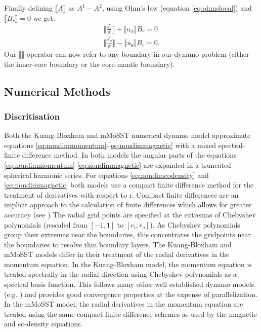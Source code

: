 Finally defining $\llbracket A \rrbracket$ as $A^{1}-A^{2}$, using Ohm's law (equation \ref{eq:ohmslocal}) and $\llbracket B_r \rrbracket=0$ we get:
\begin{align}
\bigg\llbracket \frac{J_{\theta}}{\sigma}\bigg\rrbracket+ \llbracket u_{\phi}\rrbracket B_r= 0 \\
\bigg\llbracket \frac{J_{\phi}}{\sigma}\bigg\rrbracket -\llbracket u_{\theta}\rrbracket B_r= 0.
\end{align}
Our $\llbracket \rrbracket$ operator can now refer to any boundary in our dynamo problem (either the inner-core boundary or the core-mantle boundary).

\subsection{Numerical Methods}

\subsubsection{Discritisation}
Both the Kuang-Bloxham and mMoSST numerical dynamo model approximate equations \ref{eq:nondimmomentum}-\ref{eq:nondimmagnetic} with a mixed spectral-finite difference method. In both models the angular parts of the equations \ref{eq:nondimmomentum}-\ref{eq:nondimmagnetic} are expanded in a truncated spherical harmonic series. For equations \ref{eq:nondimcodensity} and \ref{eq:nondimmagnetic} both models use a compact finite difference method for the treatment of derivatives with respect to r. Compact finite differences are an implicit approach to the calculation of finite differences which allows for greater accuracy (see \citet{lele1992}) The radial grid points are specified at the extremas of Chebyshev polynomials (rescaled from $[-1, 1]$ to $[r_i, r_o]$). As Chebyshev polynomials group their extremas near the boundaries, this concentrates the gridpoints near the boundaries to resolve thin boundary layers. The Kuang-Bloxham and mMoSST models differ in their treatment of the radial derivatives in the momentum equation. In the Kuang-Bloxham model, the momentum equation is treated spectrally in the radial direction using Chebyshev polynomials as a spectral basis function. This follows many other well established dynamo models (e.g. \citet{wicht2002}) and provides good convergence properties at the expense of parallelization. In the mMoSST model, the radial derivatives in the momentum equation are treated using the same compact finite difference schemes as used by the magnetic and co-density equations.


